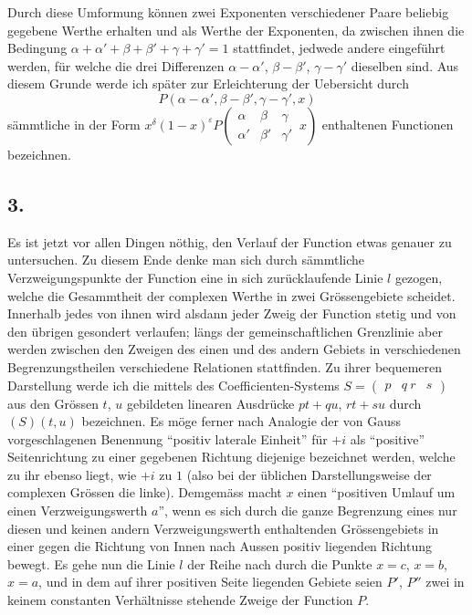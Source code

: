 \documentclass[12pt,a4paper]{book}
\theoremstyle{definition}
\theoremstyle{remark}
\begin{document}
Durch diese Umformung können zwei Exponenten verschiedener Paare beliebig gegebene Werthe erhalten und als Werthe der Exponenten, da zwischen ihnen die Bedingung $\alpha + \alpha' + \beta + \beta' + \gamma + \gamma' = 1$ stattfindet, jedwede andere eingeführt werden, für welche die drei Differenzen $\alpha - \alpha'$, $\beta - \beta'$, $\gamma - \gamma'$ dieselben sind. Aus diesem Grunde werde ich später zur Erleichterung der Uebersicht durch
\[
P(\alpha - \alpha', \beta - \beta', \gamma - \gamma', x)
\]
sämmtliche in der Form $x^{\delta} (1-x)^{\varepsilon} P\left(\begin{array}{ccc|} \alpha & \beta & \gamma \\ \alpha' & \beta' & \gamma' \end{array}\, x\right)$ enthaltenen Functionen bezeichnen.

\subsection*{3.}

Es ist jetzt vor allen Dingen nöthig, den Verlauf der Function etwas genauer zu untersuchen. Zu diesem Ende denke man sich durch sämmtliche Verzweigungspunkte der Function eine in sich zurücklaufende Linie $l$ gezogen, welche die Gesammtheit der complexen Werthe in zwei Grössengebiete scheidet. Innerhalb jedes von ihnen wird alsdann jeder Zweig der Function stetig und von den übrigen gesondert verlaufen; längs der gemeinschaftlichen Grenzlinie aber werden zwischen den Zweigen des einen und des andern Gebiets in verschiedenen Begrenzungstheilen verschiedene Relationen stattfinden. Zu ihrer bequemeren Darstellung werde ich die mittels des Coefficienten-Systems $S = \begin{pmatrix} p & q \ r & s \end{pmatrix}$ aus den Grössen $t$, $u$ gebildeten linearen Ausdrücke $pt + qu$, $rt + su$ durch $(S)(t, u)$ bezeichnen. Es möge ferner nach Analogie der von Gauss vorgeschlagenen Benennung ``positiv laterale Einheit'' für $+i$ als ``positive'' Seitenrichtung zu einer gegebenen Richtung diejenige bezeichnet werden, welche zu ihr ebenso liegt, wie $+i$ zu $1$ (also bei der üblichen Darstellungsweise der complexen Grössen die linke). Demgemäss macht $x$ einen ``positiven Umlauf um einen Verzweigungswerth $a$'', wenn es sich durch die ganze Begrenzung eines nur diesen und keinen andern Verzweigungswerth enthaltenden Grössengebiets in einer gegen die Richtung von Innen nach Aussen positiv liegenden Richtung bewegt. Es gehe nun die Linie $l$ der Reihe nach durch die Punkte $x = c$, $x = b$, $x = a$, und in dem auf ihrer positiven Seite liegenden Gebiete seien $P'$, $P''$ zwei in keinem constanten Verhältnisse stehende Zweige der Function $P$.
\end{document}
